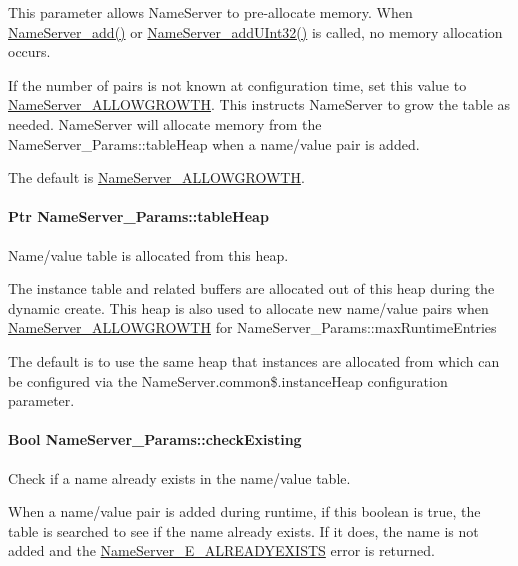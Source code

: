 This parameter allows NameServer to pre-\/allocate memory. When \hyperlink{_name_server_8h_ad7d45ed8fe5bcd1f10da5914c8da39f5}{NameServer\_\-add()} or \hyperlink{_name_server_8h_ac130195a04a34dfa2daba6ec3fff65d6}{NameServer\_\-addUInt32()} is called, no memory allocation occurs.

If the number of pairs is not known at configuration time, set this value to \hyperlink{_name_server_8h_aee02296103cd2e162143d40c917697d7}{NameServer\_\-ALLOWGROWTH}. This instructs NameServer to grow the table as needed. NameServer will allocate memory from the NameServer\_\-Params::tableHeap when a name/value pair is added.

The default is \hyperlink{_name_server_8h_aee02296103cd2e162143d40c917697d7}{NameServer\_\-ALLOWGROWTH}. 
\paragraph[{tableHeap}]{\setlength{\rightskip}{0pt plus 5cm}Ptr {\bf NameServer\_\-Params::tableHeap}}\hfill\label{struct_name_server___params_ac9c03b5c29cfe0507d2015c08253f69d}
Name/value table is allocated from this heap.

The instance table and related buffers are allocated out of this heap during the dynamic create. This heap is also used to allocate new name/value pairs when \hyperlink{_name_server_8h_aee02296103cd2e162143d40c917697d7}{NameServer\_\-ALLOWGROWTH} for NameServer\_\-Params::maxRuntimeEntries

The default is to use the same heap that instances are allocated from which can be configured via the NameServer.common\$.instanceHeap configuration parameter. 
\paragraph[{checkExisting}]{\setlength{\rightskip}{0pt plus 5cm}Bool {\bf NameServer\_\-Params::checkExisting}}\hfill\label{struct_name_server___params_ac1accae9db70ea330e40c8da8d311eab}
Check if a name already exists in the name/value table.

When a name/value pair is added during runtime, if this boolean is true, the table is searched to see if the name already exists. If it does, the name is not added and the \hyperlink{_name_server_8h_ac52dae450ec3de45caa3ce1fe143b46e}{NameServer\_\-E\_\-ALREADYEXISTS} error is returned.

